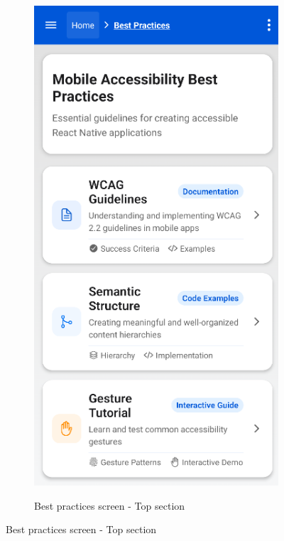 \begin{figure}[ht]
    \centering
    \begin{subfigure}[b]{0.48\textwidth}
        \centering
        \includegraphics[width=\linewidth, alt={First part of the Best Practices Screen}]{img/practices1.png}
        \caption{Best practices screen - Top section}

\end{subfigure}
\end{figure}
